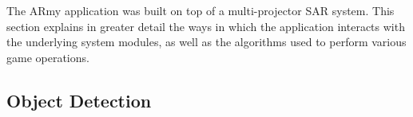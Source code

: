 \documentclass[review]{vgtc}                 %
\begin{document}

The ARmy application was built on top of a multi-projector SAR system.
This section explains in greater detail the ways in which the
application interacts with the underlying system modules, as well as
the algorithms used to perform various game operations.

\subsection{Object Detection }

\end{document}
